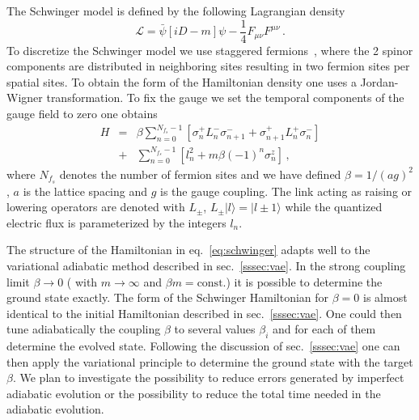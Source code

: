 \documentclass[10pt]{article}
\begin{document}
The Schwinger model is defined by the following
Lagrangian density
\begin{equation}
  \mathcal{L} = \bar\psi \left[i D - m\right]\psi - \frac{1}{4}F_{\mu\nu}F^{\mu\nu}\,.
\end{equation}  
To discretize the Schwinger model we use staggered fermions~\cite{Kogut:1974ag,Banks:1975gq}, where
the 2 spinor components are distributed in neighboring sites resulting in
two fermion sites per spatial sites.
To obtain the form of the Hamiltonian density one uses a Jordan-Wigner
transformation. To fix the gauge we set the temporal components
of the gauge field to zero one obtains~\cite{Kuhn:2014rha,Klco:2018kyo}
\begin{eqnarray}
H &=& \beta \sum_{n=0}^{N_{f_s}-1} \left[\sigma_n^{+} L_n^- \sigma_{n+1}^{-} +
  \sigma_{n+1}^{+} L_n^+ \sigma_{n}^{-}\right] \\ \nonumber
&+& \sum_{n=0}^{N_{f_s}-1}\left[ l_n^2 + m \beta (-1)^n \sigma_n^z\right]\,,
\label{eq:schwinger}
\end{eqnarray}
where $N_{f_s}$ denotes the number of fermion sites
and we have defined $\beta = 1/(ag)^2$, $a$ is the lattice spacing and
$g$ is the gauge coupling. The link acting as raising or lowering operators are
denoted with $L_{\pm}$, $L_{\pm} |l\rangle = |l \pm 1 \rangle$
while the quantized electric flux is parameterized by the integers $l_n$.

The structure of the Hamiltonian in eq.~\eqref{eq:schwinger} adapts well to the
variational adiabatic method described in sec.~\ref{sssec:vae}. In the strong coupling limit
$\beta \rightarrow 0$ ( with $m \rightarrow \infty$ and $\beta m = \textrm{const.}$)
it is possible to determine the ground state exactly.
The form of the Schwinger Hamiltonian for $\beta = 0$ is almost identical to the
initial Hamiltonian described in sec.~\ref{sssec:vae}.
One could then tune adiabatically the coupling $\beta$ to several values
$\beta_i$ and for each of them determine the evolved state.
Following the discussion of sec.~\ref{sssec:vae} one can then apply the variational
principle to determine the ground state with the target $\beta$.
We plan to investigate the possibility to reduce
errors generated by imperfect adiabatic evolution 
or the possibility to reduce the
total time needed in the adiabatic evolution.
\end{document}
